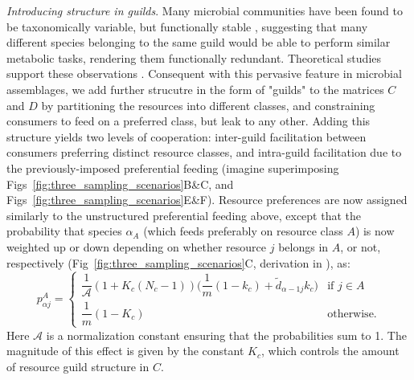 \documentclass[10pt,letterpaper]{article}
\begin{document}
\textit{Introducing structure in guilds}. 
Many microbial communities have been found to be taxonomically variable, but functionally stable \cite{Louca2018, Enke2019}, suggesting that many different species belonging to the same guild would be able to perform similar metabolic tasks, rendering them functionally redundant. Theoretical studies support these observations \cite{Goldford2018, Fant2021, Marsland2020}. Consequent with this pervasive feature in microbial assemblages, we add further strucutre in the form of "guilds" to the matrices $C$ and $D$ by partitioning the resources into different classes, and constraining consumers to feed on a preferred class, but leak to any other. Adding this structure yields two levels of cooperation: inter-guild facilitation between consumers preferring distinct resource classes, and intra-guild facilitation due to the previously-imposed preferential feeding (imagine superimposing Figs~\ref{fig:three_sampling_scenarios}B\&C, and Figs~\ref{fig:three_sampling_scenarios}E\&F).
Resource preferences are now assigned similarly to the unstructured preferential feeding above, except that the probability that species $\alpha_A$ (which feeds preferably on resource class $A$) is now weighted up or down depending on whether resource $j$ belongs in $A$, or not, respectively (Fig~\ref{fig:three_sampling_scenarios}C, derivation in ), as:
\begin{equation}\label{eq:general_sampling}
    p^A_{\alpha j} = 
     \begin{cases}
        \dfrac{1}{\mathcal{A}}\left(1 + K_c(N_c - 1)\right) \Big(\dfrac{1}{m}\left(1-k_c\right) + \tilde{d}_{\alpha - 1 j}k_c\Big) & \text{if } j \in A \\[10pt]
        \dfrac{1}{m}(1-K_c) & \text{otherwise}.
     \end{cases}
\end{equation}
Here $\mathcal{A}$ is a normalization constant ensuring that the probabilities sum to 1. The magnitude of this effect is given by the constant $K_c$, which controls the amount of resource guild structure in $C$.
\end{document}
